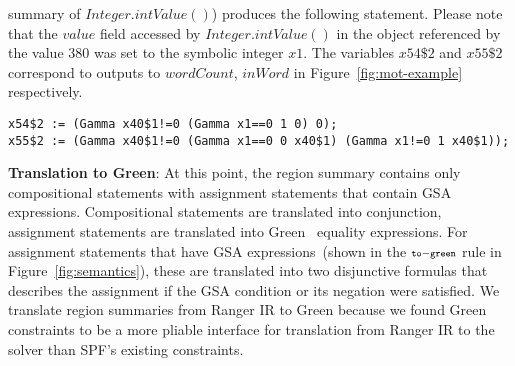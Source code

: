 summary of $Integer.intValue()$) produces the following statement.
%
Please note that the $value$ field accessed by $Integer.intValue()$ in the object referenced by the value
380 was set to the symbolic integer $x1$.
%
The variables $x54\$2$ and $x55\$2$ correspond to outputs to $wordCount$, $inWord$ in Figure~\ref{fig:mot-example} respectively.
\begin{lstlisting}[numbers=none]
x54$2 := (Gamma x40$1!=0 (Gamma x1==0 1 0) 0);
x55$2 := (Gamma x40$1!=0 (Gamma x1==0 0 x40$1) (Gamma x1!=0 1 x40$1));
\end{lstlisting}
\textbf{Translation to Green}:
%
At this point, the region summary contains only compositional statements with assignment statements that contain
GSA expressions.
%
Compositional statements are translated into conjunction, assignment statements are translated into Green~\cite{green}
equality expressions.
%
For assignment statements that have GSA expressions~(shown in the $\scriptstyle\mathtt{to-green}$ rule in Figure~\ref{fig:semantics}),
these are translated into two disjunctive formulas that describes the assignment if the GSA condition or its negation
were satisfied.
%
We translate region summaries from Ranger IR to Green because we found Green constraints to be a more pliable interface
for translation from Ranger IR to the solver than SPF\rq s existing constraints.

